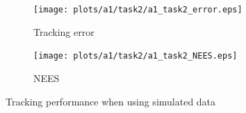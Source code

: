 \begin{figure}
    \centering
    \hspace*{-2cm}\begin{adjustbox}{minipage=\linewidth, scale=1}
        \begin{subfigure}{.5\textwidth}
            \texttt{[image: plots/a1/task2/a1\_task2\_error.eps]} 
            \caption{Tracking error}
            \label{fig:task22_tracking_error}
        \end{subfigure}
        \begin{subfigure}{.5\textwidth}
            \texttt{[image: plots/a1/task2/a1\_task2\_NEES.eps]} 
            \caption{NEES}
            \label{fig:task22_NEES}
        \end{subfigure}
    \end{adjustbox}
        \caption{Tracking performance when using simulated data}
\end{figure}